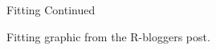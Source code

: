 \documentclass[11pt]{beamer}
\begin{document}
\begin{frame}{
	\begin{minipage}[t]{0.55\textwidth}
		Fitting Continued
	\end{minipage}
	\hfill
	\begin{minipage}[t]{0.35\textwidth}
		\flushright
	\end{minipage}
}{}
Fitting graphic from the R-bloggers post\parencite{fitting_graphic}.

\begin{center}
\end{center}

\end{frame}
\end{document}
